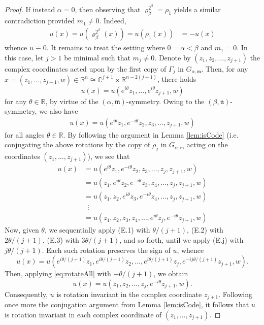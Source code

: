 \documentclass[10pt, reqno]{amsart}
\newcommand{\RR}{\mathbb{R}}
\newcommand{\CC}{\mathbb{C}}
\newcommand{\m}{\mathfrak{m}}
\newcommand{\n}{\mathfrak{n}}
\numberwithin{equation}{section}
\theoremstyle{definition}
\theoremstyle{remark}
\theoremstyle{plain}
\begin{document}
\begin{proof}
		If instead $\alpha = 0$, then observing that $\varrho_{\beta}^{2^{\beta}} = \rho_1$ yields a similar contradiction provided $m_1 \ne 0$. Indeed,
		\begin{align*}
			u(x) = u(\varrho_{\beta}^{2^{\beta}}(x))
			= u(\rho_1(x))
			&= -u(x)
		\end{align*}
		whence $u \equiv 0$.
		It remains to treat the setting where $0 = \alpha < \beta$ and $m_1 = 0$. In this case,  let $j > 1$ be minimal such that $m_j \ne 0$. Denote by $(z_1,z_2,\dots, z_{j+1})$ the complex coordinates acted upon by the first copy of $\Gamma_j$ in $G_{\alpha, \m}$. Then, for any $x = (z_1,\dots, z_{j+1}, w) \in \RR^n \cong \CC^{j+1} \times \RR^{n-2(j+1)}$, there holds
		\begin{equation}\label{eq:rotateAll}
			u(x) = u(e^{i\theta}z_1, \dots, e^{i\theta} z_{j+1}, w)
		\end{equation}
		for any $\theta \in \RR$, by virtue of the $(\alpha,\m)$-symmetry. Owing to the $(\beta, \n)$-symmetry, we also have
		\begin{align*}
			u(x) = u(e^{i\theta}z_1, e^{-i\theta} z_{2}, z_3, \dots, z_{j+1}, w)
		\end{align*}
		for all angles $\theta \in \RR$. By following the argument in Lemma \ref{lem:isCode} (i.e. conjugating the above rotations by the copy of $\rho_j$ in $G_{\alpha,\m}$ acting on the coordinates $(z_1,\dots,z_{j+1})$), we see that 
		\begin{align}
			u(x) &= u(e^{i\theta}z_1, e^{-i\theta} z_{2}, z_3, \dots, z_{j}, z_{j+1}, w) \tag{E.1}\\
			&= u(z_1, e^{i\theta} z_{2}, e^{-i\theta}z_3, z_4, \dots, z_{j}, z_{j+1}, w)\tag{E.2}\\
			&= u(z_1, z_2, e^{i\theta} z_{3}, e^{-i\theta}z_4, \dots, z_{j}, z_{j+1}, w)\tag{E.3}\\
			&\,\,\,\vdots\tag*{}\\
			&= u(z_1, z_2, z_{3}, z_4, \dots, e^{i\theta}z_{j}, e^{-i\theta}z_{j+1}, w) \tag{E.j}
		\end{align}
		Now, given $\theta$, we sequentially apply (E.1) with $\theta/(j+1)$, (E.2) with $2\theta/(j+1)$, (E.3)  with $3\theta/(j+1)$, and so forth, until we apply (E.j) with $j\theta/(j+1)$. Each such rotation preserves the sign of $u$, whence
		\[
		u(x) = u(e^{i\theta/(j+1)}z_1, e^{i\theta/(j+1)} z_2, \dots, e^{i\theta/(j+1)} z_{j}, e^{-ij\theta/(j+1)}z_{j+1}, w).
		\]
		Then, applying \eqref{eq:rotateAll} with $-\theta/(j+1)$, we obtain
		\[
		u(x) = u(z_1, z_2, \dots, z_{j}, e^{-i\theta}z_{j+1}, w).
		\]
		Consequently, $u$ is rotation invariant in the complex coordinate $z_{j+1}$. Following once more the conjugation argument from Lemma \ref{lem:isCode}, it follows that $u$ is rotation invariant in each complex coordinate of $(z_1,\dots, z_{j+1})$. 
		

\end{proof}
\end{document}
